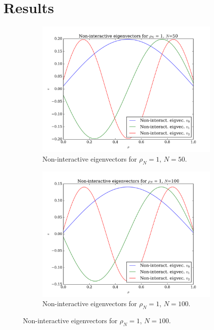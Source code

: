 \documentclass[11pt,a4paper,notitlepage]{article}
\begin{document}
\section{Results}
\begin{figure}[H]
\center
	\begin{subfigure}[t]{0.45\textwidth}
		\includegraphics[scale=0.40]{../non_interacting_eigvec_plot_rhoN=1_N=50.png}
		\caption{Non-interactive eigenvectors for $\rho_N = 1$, $N = 50$.}\label{fig:eigvecs-non-interact-1-50}
	\end{subfigure}
	\hfill
	\begin{subfigure}[t]{0.45\textwidth}
		\includegraphics[scale=0.40]{../non_interacting_eigvec_plot_rhoN=1_N=100.png}
		\caption{Non-interactive eigenvectors for $\rho_N = 1$, $N = 100$.}\label{fig:eigvecs-non-interact-1-100}

\end{subfigure}
\end{figure}
\end{document}
